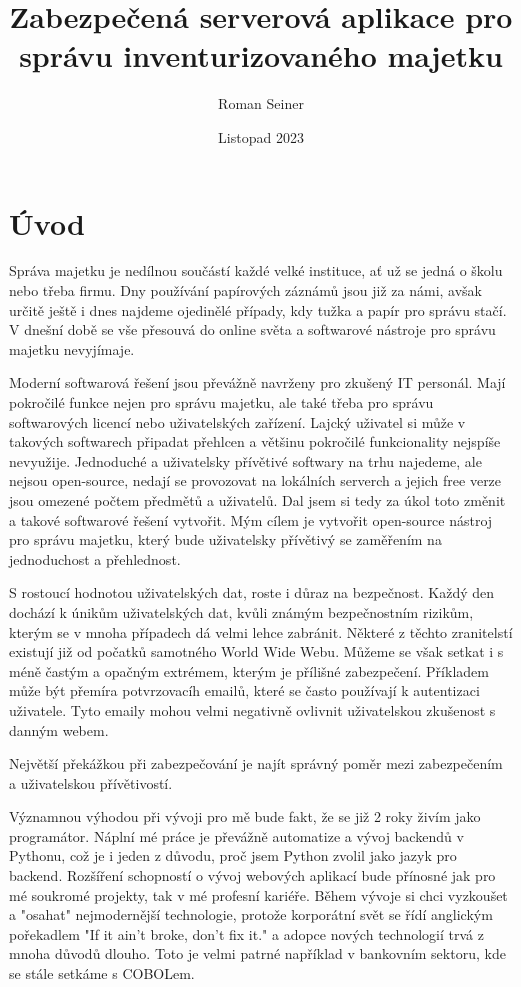 \documentclass[12pt, a4paper]{article}
\title{Zabezpečená serverová aplikace pro správu inventurizovaného majetku}
\author{Roman Seiner}
\date{Listopad 2023}
\begin{document}
\maketitle

\tableofcontents


\clearpage

\section*{Úvod}
Správa majetku je nedílnou součástí každé velké instituce, ať už se jedná o školu nebo třeba firmu. Dny používání papírových záznámů jsou již za námi, avšak určitě ještě i dnes najdeme ojedinělé případy, kdy tužka a papír pro správu stačí. V dnešní době se vše přesouvá do online světa a softwarové nástroje pro správu majetku nevyjímaje.

Moderní softwarová řešení jsou převážně navrženy pro zkušený IT personál. Mají pokročilé funkce nejen pro správu majetku, ale také třeba pro správu softwarových licencí nebo uživatelských zařízení. Lajcký uživatel si může v takových softwarech připadat přehlcen a většinu pokročilé funkcionality nejspíše nevyužije. Jednoduché a uživatelsky přívětivé softwary na trhu najedeme, ale nejsou open-source, nedají se provozovat na lokálních serverch a jejich free verze jsou omezené počtem předmětů a uživatelů. Dal jsem si tedy za úkol toto změnit a takové softwarové řešení vytvořit. Mým cílem je vytvořit open-source nástroj pro správu majetku, který bude uživatelsky přívětivý se zaměřením na jednoduchost a přehlednost.

S rostoucí hodnotou uživatelských dat, roste i důraz na bezpečnost. Každý den dochází k únikům uživatelských dat, kvůli známým bezpečnostním rizikům, kterým se v mnoha případech dá velmi lehce zabránit. Některé z těchto zranitelstí existují již od počatků samotného World Wide Webu. Můžeme se však setkat i s méně častým a opačným extrémem, kterým je přílišné zabezpečení. Příkladem může být přemíra potvrzovacíh emailů, které se často používají k autentizaci uživatele. Tyto emaily mohou velmi negativně ovlivnit uživatelskou zkušenost s danným webem.

Největší překážkou při zabezpečování je najít správný poměr mezi zabezpečením a uživatelskou přívětivostí.  

Významnou výhodou při vývoji pro mě bude fakt, že se již 2 roky živím jako programátor. Náplní mé práce je převážně automatize a vývoj backendů v Pythonu, což je i jeden z důvodu, proč jsem Python zvolil jako jazyk pro backend. Rozšíření schopností o vývoj webových aplikací bude přínosné jak pro mé soukromé projekty, tak v mé profesní kariéře. Během vývoje si chci vyzkoušet a "osahat" nejmodernější technologie, protože korporátní svět se řídí anglickým pořekadlem "If it ain't broke, don't fix it." a adopce nových technologií trvá z mnoha důvodů dlouho. Toto je velmi patrné například v bankovním sektoru, kde se stále setkáme s COBOLem. 
\clearpage
\end{document}
